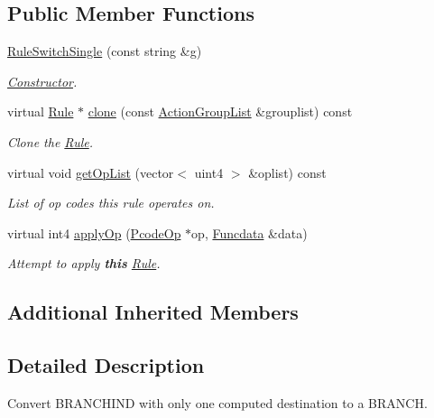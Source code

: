 \subsection*{Public Member Functions}
\begin{DoxyCompactItemize}
\item 
\mbox{\hyperlink{class_rule_switch_single_a0c4e909024de24f8c437a8cde2ed99e6}{Rule\+Switch\+Single}} (const string \&g)
\begin{DoxyCompactList}\small\item\em \mbox{\hyperlink{class_constructor}{Constructor}}. \end{DoxyCompactList}\item 
virtual \mbox{\hyperlink{class_rule}{Rule}} $\ast$ \mbox{\hyperlink{class_rule_switch_single_ab260d5a864f7aa58bcaae9cd39050c23}{clone}} (const \mbox{\hyperlink{class_action_group_list}{Action\+Group\+List}} \&grouplist) const
\begin{DoxyCompactList}\small\item\em Clone the \mbox{\hyperlink{class_rule}{Rule}}. \end{DoxyCompactList}\item 
virtual void \mbox{\hyperlink{class_rule_switch_single_a75ce31e4e14853511c96a92141cf56d2}{get\+Op\+List}} (vector$<$ uint4 $>$ \&oplist) const
\begin{DoxyCompactList}\small\item\em List of op codes this rule operates on. \end{DoxyCompactList}\item 
virtual int4 \mbox{\hyperlink{class_rule_switch_single_ab884de26def65edb9ade3b981c6983e1}{apply\+Op}} (\mbox{\hyperlink{class_pcode_op}{Pcode\+Op}} $\ast$op, \mbox{\hyperlink{class_funcdata}{Funcdata}} \&data)
\begin{DoxyCompactList}\small\item\em Attempt to apply {\bfseries{this}} \mbox{\hyperlink{class_rule}{Rule}}. \end{DoxyCompactList}\end{DoxyCompactItemize}
\subsection*{Additional Inherited Members}


\subsection{Detailed Description}
Convert B\+R\+A\+N\+C\+H\+I\+ND with only one computed destination to a B\+R\+A\+N\+CH. 

